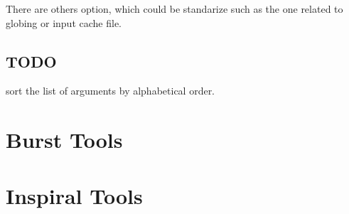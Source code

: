 \documentclass{book}
\begin{document}
There are others option, which could be standarize such as the one related to
globing or input cache file.


\section{TODO}
sort the list of arguments by alphabetical order.



\chapter{Burst Tools}

\chapter{Inspiral Tools}


\end{document}
